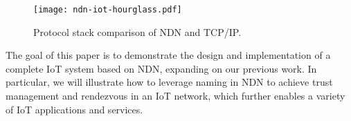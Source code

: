 \begin{figure}[!t]
\centering
\texttt{[image: ndn-iot-hourglass.pdf]}
\caption{Protocol stack comparison of NDN and TCP/IP.}
\label{fig:ndnot-vs-iot}
\end{figure}

The goal of this paper is to demonstrate the design and implementation of a complete IoT system based on NDN, expanding on our previous work.
In particular, we will illustrate how to leverage naming in NDN to achieve trust management and rendezvous in an IoT network, which further enables a variety of IoT applications and services.
